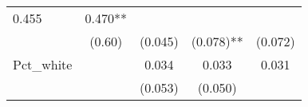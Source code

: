 \documentclass[12pt,twoside]{reedthesis}
\begin{document}
\begin{longtable}[]{@{}lcccc@{}}
\begin{minipage}[t]{0.14\columnwidth}
  0.455\strut
  \end{minipage} & \begin{minipage}[t]{0.14\columnwidth}\centering\strut
  0.470**\strut
  \end{minipage}\tabularnewline
  \begin{minipage}[t]{0.26\columnwidth}\raggedright\strut
  \strut
  \end{minipage} & \begin{minipage}[t]{0.12\columnwidth}\centering\strut
  (0.60)\strut
  \end{minipage} & \begin{minipage}[t]{0.13\columnwidth}\centering\strut
  (0.045)\strut
  \end{minipage} & \begin{minipage}[t]{0.14\columnwidth}\centering\strut
  (0.078)**\strut
  \end{minipage} & \begin{minipage}[t]{0.14\columnwidth}\centering\strut
  (0.072)\strut
  \end{minipage}\tabularnewline
  \begin{minipage}[t]{0.26\columnwidth}\raggedright\strut
  Pct\_white\strut
  \end{minipage} & \begin{minipage}[t]{0.12\columnwidth}\centering\strut
  \strut
  \end{minipage} & \begin{minipage}[t]{0.13\columnwidth}\centering\strut
  0.034\strut
  \end{minipage} & \begin{minipage}[t]{0.14\columnwidth}\centering\strut
  0.033\strut
  \end{minipage} & \begin{minipage}[t]{0.14\columnwidth}\centering\strut
  0.031\strut
  \end{minipage}\tabularnewline
  \begin{minipage}[t]{0.26\columnwidth}\raggedright\strut
  \strut
  \end{minipage} & \begin{minipage}[t]{0.12\columnwidth}\centering\strut
  \strut
  \end{minipage} & \begin{minipage}[t]{0.13\columnwidth}\centering\strut
  (0.053)\strut
  \end{minipage} & \begin{minipage}[t]{0.14\columnwidth}\centering\strut
  (0.050)\strut
  \end{minipage} & \begin{minipage}[t]{0.14\columnwidth}\centering\strut

\end{minipage}
\end{longtable}
\end{document}
